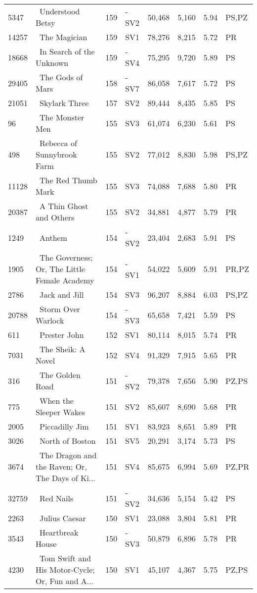 \begin{longtable}{l | l | l | l | l | l | l | l}
5347 & ~Understood Betsy & 159 & -SV2 & 50,468 & 5,160 & 5.94 & PS,PZ\\
14257 & ~The Magician & 159 & SV1 & 78,276 & 8,215 & 5.72 & PR\\
18668 & ~In Search of the Unknown & 159 & -SV4 & 75,295 & 9,720 & 5.89 & PS\\
29405 & ~The Gods of Mars & 158 & -SV7 & 86,058 & 7,617 & 5.72 & PS\\
21051 & ~Skylark Three & 157 & SV2 & 89,444 & 8,435 & 5.85 & PS\\
96 & ~The Monster Men & 155 & SV3 & 61,074 & 6,230 & 5.61 & PS\\
498 & ~Rebecca of Sunnybrook Farm & 155 & SV2 & 77,012 & 8,830 & 5.98 & PS,PZ\\
11128 & ~The Red Thumb Mark & 155 & SV3 & 74,088 & 7,688 & 5.80 & PR\\
20387 & ~A Thin Ghost and Others & 155 & SV2 & 34,881 & 4,877 & 5.79 & PR\\
1249 & ~Anthem & 154 & -SV2 & 23,404 & 2,683 & 5.91 & PS\\
1905 & ~The Governess; Or, The Little Female Academy & 154 & -SV1 & 54,022 & 5,609 & 5.91 & PR,PZ\\
2786 & ~Jack and Jill & 154 & SV3 & 96,207 & 8,884 & 6.03 & PS,PZ\\
20788 & ~Storm Over Warlock & 154 & -SV3 & 65,658 & 7,421 & 5.59 & PS\\
611 & ~Prester John & 152 & SV1 & 80,114 & 8,015 & 5.74 & PR\\
7031 & ~The Sheik: A Novel & 152 & SV4 & 91,329 & 7,915 & 5.65 & PR\\
316 & ~The Golden Road & 151 & -SV2 & 79,378 & 7,656 & 5.90 & PZ,PS\\
775 & ~When the Sleeper Wakes & 151 & SV2 & 85,607 & 8,690 & 5.68 & PR\\
2005 & ~Piccadilly Jim & 151 & SV1 & 83,923 & 8,651 & 5.89 & PR\\
3026 & ~North of Boston & 151 & SV5 & 20,291 & 3,174 & 5.73 & PS\\
3674 & ~The Dragon and the Raven; Or, The Days of Ki... & 151 & SV4 & 85,675 & 6,994 & 5.69 & PZ,PR\\
32759 & ~Red Nails & 151 & -SV2 & 34,636 & 5,154 & 5.42 & PS\\
2263 & ~Julius Caesar & 150 & SV1 & 23,088 & 3,804 & 5.81 & PR\\
3543 & ~Heartbreak House & 150 & -SV3 & 50,879 & 6,896 & 5.78 & PR\\
4230 & ~Tom Swift and His Motor-Cycle; Or, Fun and A... & 150 & SV1 & 45,107 & 4,367 & 5.75 & PZ,PS\\

\end{longtable}
